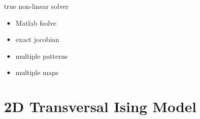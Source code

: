\documentclass[aspectratio=169]{beamer}
\begin{document}
\begin{frame}{true non-linear solver}
    \begin{itemize}
        \item Matlab fsolve
        \item exact jocobian
        \item multiple patterns
        \item multiple maps
    \end{itemize}
\end{frame}

\section{2D Transversal Ising Model}





\end{document}
